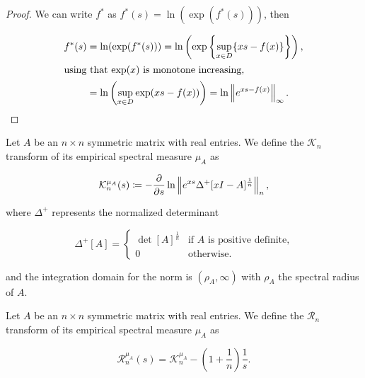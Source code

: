 \begin{proof}
    We can write $f^*$ as $f^*(s) = \ln(\exp(f^*(s)))$, then

    \begin{align*}
        f^*(s) &= \ln(\exp(f^*(s))) = \ln \left(\exp\left\{ \sup_{x\in D} \{xs-f(x)\} \right\}\right), \\
        \intertext{using that $\exp(x)$ is monotone increasing,}
        &= \ln \left( \sup_{x \in D} \exp(xs - f(x))\right) = \ln \left\lVert e^{xs-f(x)} \right\rVert_{\infty}.
    \end{align*}
\end{proof}

\begin{definition}
    Let $A$ be an $n\times n$ symmetric matrix with real entries. We define the $\mathcal K_n$ transform of its empirical spectral measure $\mu_A$ as 

    \begin{equation*}
        \mathcal K_n^{\mu_A} (s) \coloneqq - \frac{\partial}{\partial s} \ln \left\lVert e^{xs} \Delta^+ [x I - A]^{\frac1n} \right\rVert_n,
    \end{equation*}

    \noindent where $\Delta^+$ represents the normalized determinant
    
    \begin{equation*}
        \Delta^+[A] = \left\{ \begin{array}{cc}
            \det[A]^{\frac1n} & \text{if $A$ is positive definite,}\\
            0 & \text{otherwise.}
        \end{array} \right.
    \end{equation*}
    
    \noindent and the integration domain for the norm is $(\rho_A, \infty)$ with $\rho_A$ the spectral radius of $A$.
\end{definition}


\begin{definition}
    Let $A$ be an $n\times n$ symmetric matrix with real entries. We define the $\mathcal R_n$ transform of its empirical spectral measure $\mu_A$ as 

    \begin{equation*}
        \mathcal R_n^{\mu_A} (s) = \mathcal K_n^{\mu_A} - \left( 1 + \frac1n \right) \frac1s.
    \end{equation*}
\end{definition}

